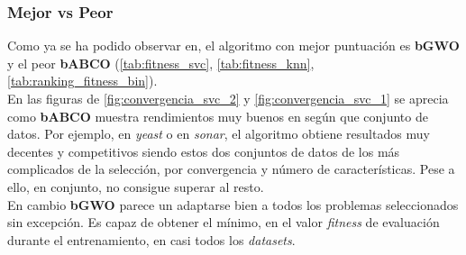 \subsubsection{Mejor vs Peor}
Como ya se ha podido observar en, el algoritmo con mejor puntuación es \textbf{bGWO} y el peor \textbf{bABCO} (\ref{tab:fitness_svc}, \ref{tab:fitness_knn}, \ref{tab:ranking_fitness_bin}). \\[6pt]
En las figuras de \ref{fig:convergencia_svc_2} y \ref{fig:convergencia_svc_1} se aprecia como \textbf{bABCO} muestra rendimientos muy buenos en según que conjunto de datos. Por ejemplo, en \textit{yeast} o en \textit{sonar}, el algoritmo obtiene resultados muy decentes y competitivos siendo estos dos conjuntos de datos de los más complicados de la selección, por convergencia y número de características. Pese a ello, en conjunto, no consigue superar al resto.\\[6pt]
En cambio \textbf{bGWO} parece un adaptarse bien a todos los problemas seleccionados sin excepción. Es capaz de obtener el mínimo, en el valor \textit{fitness} de evaluación durante el entrenamiento, en casi todos los \textit{datasets}.

